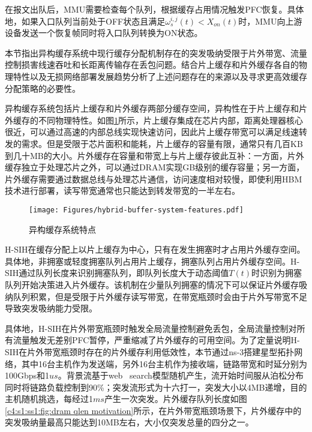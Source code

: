 在报文出队后，MMU需要检查每个队列，根据缓存占用情况触发PFC恢复。具体地，如果入口队列当前处于OFF状态且满足$\omega_{s}^{i,j}(t)<X_{on}(t)$时，MMU向上游设备发送一个恢复帧同时将入口队列转换为ON状态。

\label{c4:s2:problem analysis}

本节指出异构缓存系统中现行缓存分配机制存在的突发吸纳受限于片外带宽、流量控制损害线速吞吐和长距离传输存在丢包问题。结合片上缓存和片外缓存各自的物理特性以及无损网络部署发展趋势分析了上述问题存在的来源以及寻求更高效缓存分配策略的必要性。


异构缓存系统包括片上缓存和片外缓存两部分缓存空间，异构性在于片上缓存和片外缓存的不同物理特性。如图\ref{c4:s1:ss1:fig:hybrid buffer system features}所示，片上缓存集成在芯片内部，距离处理器核心很近，可以通过高速的内部总线实现快速访问，因此片上缓存带宽可以满足线速转发的需求。但是受限于芯片面积和能耗，片上缓存的容量有限，通常只有几百KB到几十MB的大小。片外缓存在容量和带宽上与片上缓存彼此互补：一方面，片外缓存独立于处理芯片之外，可以通过DRAM实现GB级别的缓存容量；另一方面，片外缓存需要通过数据总线与处理芯片通信，访问速度相对较慢，即使利用HBM技术\cite{jedecHBM2E,kim2019design}进行部署，读写带宽通常也只能达到转发带宽的一半左右\cite{Ciscohybridbuffer,}。

\begin{figure}[H]
  \centering
  \texttt{[image: Figures/hybrid-buffer-system-features.pdf]}
  \caption{异构缓存系统特点}
  \label{c4:s1:ss1:fig:hybrid buffer system features}
\end{figure}

H-SIH在缓存分配上以片上缓存为中心，只有在发生拥塞时才占用片外缓存空间。具体地，非拥塞或轻度拥塞队列占用片上缓存，拥塞队列占用片外缓存空间。H-SIH通过队列长度来识别拥塞队列，即队列长度大于动态阈值$T(t)$时识别为拥塞队列开始决策进入片外缓存。该机制在少量队列拥塞的情况下可以保证片外缓存吸纳队列积累，但是受限于片外缓存读写带宽，在带宽瓶颈时会由于片外写带宽不足导致突发吸纳能力受限。

具体地，H-SIH在片外带宽瓶颈时触发全局流量控制避免丢包，全局流量控制对所有流量触发无差别PFC暂停，严重缩减了片外缓存的可用空间。为了定量说明H-SIH在片外带宽瓶颈时存在的片外缓存利用低效性，本节通过ns-3搭建星型拓扑网络，其中16台主机作为发送端，另外16台主机作为接收端，链路带宽和时延分别为100Gbps和1$us$。背景流基于web \ search\cite{SIGCOMM10DCTCP}模型随机产生，流开始时间服从泊松分布同时将链路负载控制到90\%；突发流形式为十六打一，突发大小以4MB递增，目的主机随机挑选，每经过1$ms$产生一次突发。片外缓存队列长度如图\ref{c4:s1:ss1:fig:dram qlen motivation}所示，在片外带宽瓶颈场景下，片外缓存中的突发吸纳量最高只能达到10MB左右，大小仅突发总量的四分之一。

